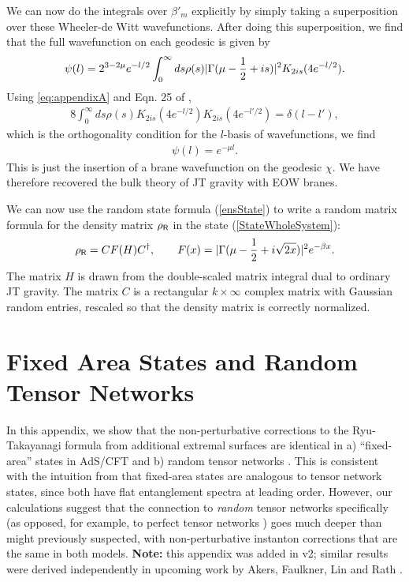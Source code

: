 \documentclass[11pt]{article}
\newcommand{\be}{\begin{equation}}
\newcommand{\ee}{\end{equation}}
\numberwithin{equation}{section}
\begin{document}
We can now do the integrals over $\beta'_m$ explicitly by simply taking a superposition over these Wheeler-de Witt wavefunctions. After doing this superposition, we find that the full wavefunction on each geodesic is given by
\begin{align}
\psi (l) = 2^{3 - 2 \mu} e^{-l/2} \int_0^\infty ds \rho(s) |\Gamma(\mu-{1\over 2}+is)|^2 K_{2 is } (4 e^{-l/2}).
\end{align}
Using \eqref{eq:appendixA} and Eqn. 25 of \cite{yakubovich2013use},
\begin{align}
8 \int_0^\infty ds\rho(s) K_{2is}(4e^{-l/2}) K_{2is}(4e^{-l'/2}) = \delta(l - l'),
\end{align}
 which is the orthogonality condition for the $l$-basis of wavefunctions, we find
\begin{align}
\psi (l) = e^{- \mu l }.
\end{align}
This is just the insertion of a brane wavefunction on the geodesic $\chi$. We have therefore recovered the bulk theory of JT gravity with EOW branes.

We can now use the random state formula (\ref{ensState}) to write a random matrix formula for the density matrix $\rho_{\sf{R}}$ in the state (\ref{StateWholeSystem}):
\be
\rho_{\sf{R}} = C F(H)C^\dagger, \hspace{20pt} F(x) = |\Gamma(\mu-\frac{1}{2}+i\sqrt{2x})|^2e^{-\beta x}.
\ee
The matrix $H$ is drawn from the double-scaled matrix integral dual to ordinary JT gravity. The matrix $C$ is a rectangular $k\times \infty$ complex matrix with Gaussian random entries, rescaled so that the density matrix is correctly normalized.

\section{Fixed Area States and Random Tensor Networks}
In this appendix, we show that the non-perturbative corrections to the Ryu-Takayanagi formula from additional extremal surfaces are identical in a) ``fixed-area'' states in AdS/CFT \cite{Akers:2018fow,Dong:2018seb} and b) random tensor networks \cite{Hayden:2016cfa}. This is consistent with the intuition from  \cite{Akers:2018fow,Dong:2018seb} that fixed-area states are analogous to tensor network states, since both have flat entanglement spectra at leading order. However, our calculations suggest that the connection to \emph{random} tensor networks specifically (as opposed, for example, to perfect tensor networks \cite{Pastawski:2015qua}) goes much deeper than might previously suspected, with non-perturbative instanton corrections that are the same in both models. {\bf Note: } this appendix was added in v2; similar results were derived independently in upcoming work by Akers, Faulkner, Lin and Rath \cite{AFLR}.
\end{document}
